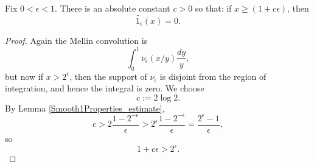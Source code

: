 \begin{lemma}
\label{Smooth1Properties_above}
\leanok
Fix $0<\epsilon<1$. There is an absolute constant $c>0$ so that:
  if $x\geq (1+c\epsilon)$, then
  $$\widetilde{1_{\epsilon}}(x) = 0.$$
\end{lemma}
\begin{proof}
\leanok
Again the Mellin convolution is
  $$\int_0^1 \nu_\epsilon(x/y)\frac{dy}{y},$$
  but now if $x > 2^\epsilon$, then the support of $\nu_\epsilon$ is disjoint
  from the region of integration, and hence the integral is zero.
  We choose
  $$
    c:=2\log 2
    .
  $$
  By Lemma \ref{Smooth1Properties_estimate},
  $$
    c > 2\frac{1-2^{-\epsilon}}\epsilon > 2^\epsilon\frac{1-2^{-\epsilon}}\epsilon
    =
    \frac{2^\epsilon-1}\epsilon,
  $$
  so
  $$
    1+c\epsilon > 2^\epsilon.
  $$
\end{proof}
